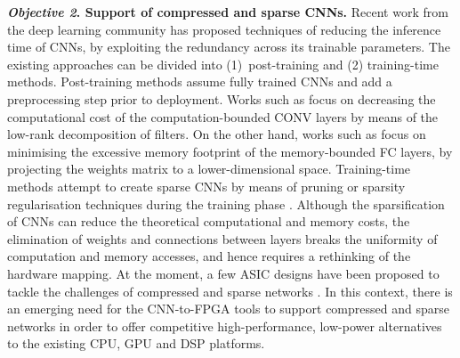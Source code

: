 \documentclass[format=acmsmall, review=false, screen=true]{acmart}
\begin{document}
\textbf{\textit{Objective 2}. Support of compressed and sparse CNNs.}
Recent work from the deep learning community has proposed techniques of reducing the inference time of CNNs, by exploiting the redundancy across its trainable parameters. The existing approaches can be divided into \mbox{(1) post-training} and (2) training-time methods. Post-training methods assume fully trained CNNs and add a preprocessing step prior to deployment. Works such as \cite{Denton_2014}\cite{Jaderberg14b} focus on decreasing the computational cost of the computation-bounded CONV layers by means of the low-rank decomposition of filters. On the other hand, works such as \cite{SVD_2013}\cite{HanMD15} focus on minimising the excessive memory footprint of the memory-bounded FC layers, by projecting the weights matrix to a lower-dimensional space. Training-time methods attempt to create sparse CNNs by means of pruning or sparsity regularisation techniques during the training phase \cite{NIPS2015_5784}\cite{Baoyuan_Liu_2015}. Although the sparsification of CNNs can reduce the theoretical computational and memory costs, the elimination of weights and connections between layers breaks the uniformity of computation and memory accesses, and hence requires a rethinking of the hardware mapping. At the moment, a few ASIC designs have been proposed to tackle the challenges of compressed and sparse networks \cite{Han2016}\cite{cambriconx_2016}\cite{Parashar_2017}. In this context, there is an emerging need for the CNN-to-FPGA tools to support compressed and sparse networks in order to offer competitive high-performance, low-power alternatives to the existing CPU, GPU and DSP platforms.
\end{document}
